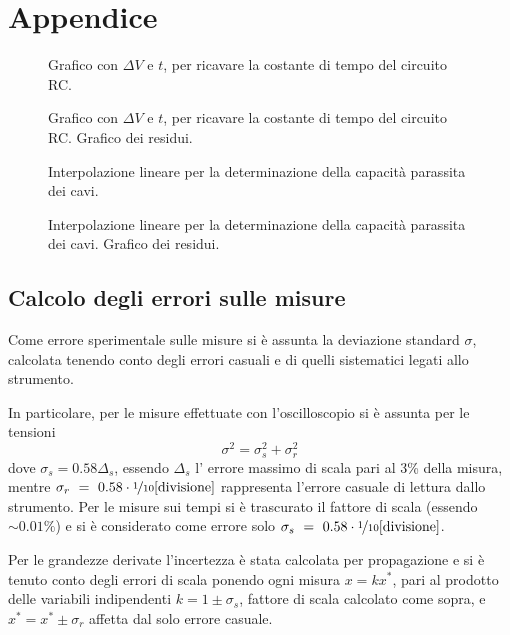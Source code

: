 \documentclass[italian,a4paper]{article}
\begin{document}
\section{Appendice}
\begin{figure}[p]\caption{Grafico con $\Delta V$ e $t$, per ricavare la costante di tempo del circuito RC.}
\centering

\end{figure}
\begin{figure}[p]\caption{Grafico con $\Delta V$ e $t$, per ricavare la costante di tempo del circuito RC. Grafico dei residui.}
\centering

\end{figure}
\begin{figure}[p]\caption{Interpolazione lineare per la determinazione della capacità parassita dei cavi.}\label{cp.graf}
\centering

\end{figure}
\begin{figure}[p]\caption{Interpolazione lineare per la determinazione della capacità parassita dei cavi. Grafico dei residui.}
\centering

\end{figure}
\subsection{Calcolo degli errori sulle misure}
Come errore sperimentale sulle misure si è assunta la deviazione standard $\sigma$, calcolata tenendo conto degli errori casuali e di quelli sistematici legati allo strumento.

In particolare, per le misure effettuate con l'oscilloscopio si è assunta per le tensioni
$$\sigma^2=\sigma^2_s+\sigma^2_r$$
dove  $\sigma_s=0.58\Delta_s$, essendo $\Delta_s$ l' errore massimo di scala pari al 3\% della misura, mentre $\sigma_r~=~0.58\cdot\nicefrac{1}{10}\text{[divisione]}$ rappresenta l'errore casuale di lettura dallo strumento.
Per le misure sui tempi si è trascurato il fattore di scala (essendo $\sim 0.01 \%$) e si è considerato come errore solo $\sigma_s~=~0.58\cdot\nicefrac{1}{10}\text{[divisione]}$.

Per le grandezze derivate l'incertezza è stata calcolata per propagazione e si è tenuto conto degli errori di scala ponendo ogni misura $x=kx^*$, pari al prodotto delle variabili indipendenti $k=1\pm \sigma_s$, fattore di scala calcolato come sopra, e $x^*=x^*\pm \sigma_r$ affetta dal solo errore casuale.
\end{document}
